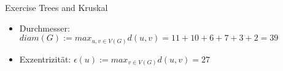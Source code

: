 \begin{frame}[allowframebreaks]{Exercise \thesection}{Trees and Kruskal}
\begin{solutionnoinc}
{\begin{minipage}[t]{18cm}
            \end{minipage}
        }
    \end{solutionnoinc}
    \begin{solutionnoinc}
    \end{solutionnoinc}
    \begin{solutionnoinc}
    \end{solutionnoinc}
    \begin{solutionnoinc}
    \end{solutionnoinc}
    \begin{solution}
    \end{solution}
    \begin{solution}
      \begin{itemize}
        \item \alert{Durchmesser:} $diam(G) := max_{u,v\in V(G)} d(u, v) = 11+10+6+7+3+2 = 39$
      \end{itemize}
    \end{solution}
    \begin{solutionnoinc}
      \begin{itemize}
        \item \alert{Exzentrizität:} $\epsilon(u) := max_{v\in V(G)} d(u,v) = 27$
      \end{itemize}
\end{solutionnoinc}
\end{frame}
